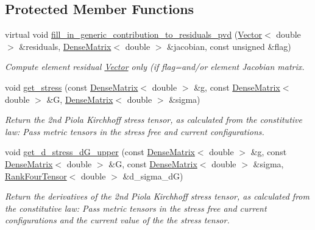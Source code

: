 \subsection*{Protected Member Functions}
\begin{DoxyCompactItemize}
\item 
virtual void \hyperlink{classoomph_1_1PVDEquations_a2e169e572d3715f08e571cb29779a754}{fill\+\_\+in\+\_\+generic\+\_\+contribution\+\_\+to\+\_\+residuals\+\_\+pvd} (\hyperlink{classoomph_1_1Vector}{Vector}$<$ double $>$ \&residuals, \hyperlink{classoomph_1_1DenseMatrix}{Dense\+Matrix}$<$ double $>$ \&jacobian, const unsigned \&flag)
\begin{DoxyCompactList}\small\item\em Compute element residual \hyperlink{classoomph_1_1Vector}{Vector} only (if flag=and/or element Jacobian matrix. \end{DoxyCompactList}\item 
void \hyperlink{classoomph_1_1PVDEquations_ae870a58617c8a268a30779e93fb96f54}{get\+\_\+stress} (const \hyperlink{classoomph_1_1DenseMatrix}{Dense\+Matrix}$<$ double $>$ \&g, const \hyperlink{classoomph_1_1DenseMatrix}{Dense\+Matrix}$<$ double $>$ \&G, \hyperlink{classoomph_1_1DenseMatrix}{Dense\+Matrix}$<$ double $>$ \&sigma)
\begin{DoxyCompactList}\small\item\em Return the 2nd Piola Kirchhoff stress tensor, as calculated from the constitutive law\+: Pass metric tensors in the stress free and current configurations. \end{DoxyCompactList}\item 
void \hyperlink{classoomph_1_1PVDEquations_a522084ede6bf0e6b6154ec0ac61c3f5f}{get\+\_\+d\+\_\+stress\+\_\+d\+G\+\_\+upper} (const \hyperlink{classoomph_1_1DenseMatrix}{Dense\+Matrix}$<$ double $>$ \&g, const \hyperlink{classoomph_1_1DenseMatrix}{Dense\+Matrix}$<$ double $>$ \&G, const \hyperlink{classoomph_1_1DenseMatrix}{Dense\+Matrix}$<$ double $>$ \&sigma, \hyperlink{classoomph_1_1RankFourTensor}{Rank\+Four\+Tensor}$<$ double $>$ \&d\+\_\+sigma\+\_\+dG)
\begin{DoxyCompactList}\small\item\em Return the derivatives of the 2nd Piola Kirchhoff stress tensor, as calculated from the constitutive law\+: Pass metric tensors in the stress free and current configurations and the current value of the the stress tensor. \end{DoxyCompactList}\end{DoxyCompactItemize}
